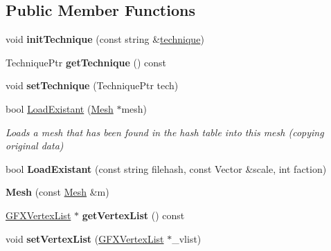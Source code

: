 \subsection*{Public Member Functions}
\begin{DoxyCompactItemize}
\item 
void {\bfseries init\+Technique} (const string \&\hyperlink{classMesh_a987e568f336befda6be200200a92509b}{technique})\hypertarget{classMesh_ade8dd6f0aafcc660089eab6b546fcaef}{}\label{classMesh_ade8dd6f0aafcc660089eab6b546fcaef}

\item 
Technique\+Ptr {\bfseries get\+Technique} () const \hypertarget{classMesh_aa46ab26d9a1014070e8efebd84bb5571}{}\label{classMesh_aa46ab26d9a1014070e8efebd84bb5571}

\item 
void {\bfseries set\+Technique} (Technique\+Ptr tech)\hypertarget{classMesh_a753368474948abad29a6f1e06dd0ef66}{}\label{classMesh_a753368474948abad29a6f1e06dd0ef66}

\item 
bool \hyperlink{classMesh_accee1e105cb68229434816ddaebe8551}{Load\+Existant} (\hyperlink{classMesh}{Mesh} $\ast$mesh)\hypertarget{classMesh_accee1e105cb68229434816ddaebe8551}{}\label{classMesh_accee1e105cb68229434816ddaebe8551}

\begin{DoxyCompactList}\small\item\em Loads a mesh that has been found in the hash table into this mesh (copying original data) \end{DoxyCompactList}\item 
bool {\bfseries Load\+Existant} (const string filehash, const Vector \&scale, int faction)\hypertarget{classMesh_a5b7c66cb8058eced5679f716074d50c6}{}\label{classMesh_a5b7c66cb8058eced5679f716074d50c6}

\item 
{\bfseries Mesh} (const \hyperlink{classMesh}{Mesh} \&m)\hypertarget{classMesh_a713cb62e7078cfd627108a0b14f72c6f}{}\label{classMesh_a713cb62e7078cfd627108a0b14f72c6f}

\item 
\hyperlink{classGFXVertexList}{G\+F\+X\+Vertex\+List} $\ast$ {\bfseries get\+Vertex\+List} () const \hypertarget{classMesh_ae83a92999485c3e9b63cfd33f30bb968}{}\label{classMesh_ae83a92999485c3e9b63cfd33f30bb968}

\item 
void {\bfseries set\+Vertex\+List} (\hyperlink{classGFXVertexList}{G\+F\+X\+Vertex\+List} $\ast$\+\_\+vlist)\hypertarget{classMesh_ac4d475a47d1ab421dcf044d6c39969a1}{}\label{classMesh_ac4d475a47d1ab421dcf044d6c39969a1}


\end{DoxyCompactItemize}
